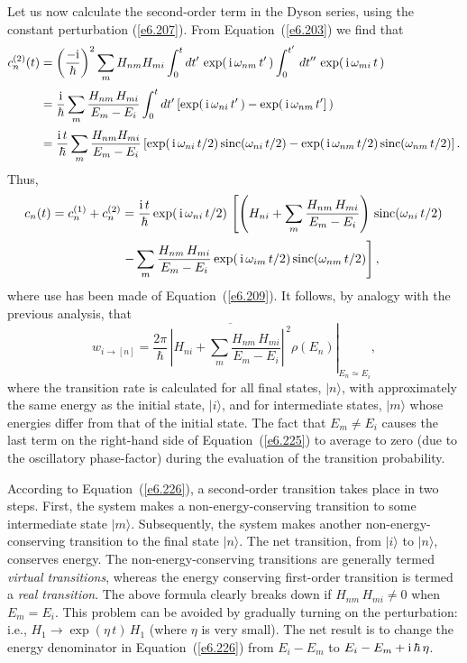 Let us now calculate  the second-order term in the Dyson series, using the
constant perturbation (\ref{e6.207}). From Equation~(\ref{e6.203}) we find that
\begin{align}
c_n^{(2)}(t) &= \left(\frac{-{\rm i}}{\hbar}\right)^2 \sum_m H_{nm} H_{mi}
\int_0^t dt'\, \exp(\,{\rm i}\,\omega_{nm}\,t'\,) \int_0^{t'} \,
dt'' \,\exp(\,{\rm i} \,\omega_{mi}\,t\,)\nonumber\\[0.5ex]
&=\frac{\rm i}{\hbar} \sum_m \frac{H_{nm} \,H_{mi}}{E_m - E_i}
\int_0^t dt' \left[\exp(\,{\rm i}\,\omega_{ni}\,t'\,)
 - \exp(\,{\rm i}\,\omega_{nm}\,t']\,\right)\nonumber\\[0.5ex]
&= \frac{{\rm i}\,t}{\hbar} \sum_m \frac{H_{nm} H_{mi}}{E_m - E_i}
\left[ \exp(\,{\rm i}\,\omega_{ni}\, t/2) \,{\rm sinc}(\omega_{ni}\,t/2)- \exp(\,{\rm i}\,\omega_{nm} \,t/2) \,{\rm sinc}(\omega_{nm}\,t/2)\right].
\end{align}
Thus,
\begin{align}
c_n(t) = c_n^{(1)}+ c_n^{(2)} &=  \frac{{\rm i}\,t}{\hbar}
\exp(\,{\rm i}\,\omega_{ni}\,t/2)\,
\left[ \left(H_{ni} + \sum_m \frac{H_{nm}\,H_{mi}}{E_m - E_i}\right)\, {\rm sinc} (\omega_{ni}\,t/2)\right.\nonumber
\\[0.5ex]&\left.
 - \sum_m\frac{H_{nm}\,H_{mi}}{E_m - E_i}
\exp(\,{\rm i}\,\omega_{im}\,t/2)\,{\rm sinc}(\omega_{nm}\,t/2)\right],\label{e6.225}
\end{align}
where use has been made of Equation~(\ref{e6.209}). It follows, by analogy with the
previous analysis, that
\begin{equation}\label{e6.226}
w_{i\rightarrow [n]} =\left. \frac{2\pi}{\hbar}\, \overline{ \left|
H_{ni} + \sum_m \frac{H_{nm}\,H_{mi}}{E_m - E_i}\right|^{\,2}} \rho(E_n)
\right|_{E_n  \simeq E_i},
\end{equation}
where the transition rate is calculated for all final states, $|n\rangle$, with
approximately the same energy as the initial state, $|i\rangle$, and for
intermediate states, $|m\rangle$ whose energies differ from that of
the initial state. The fact that $E_m\neq E_i$ causes the last term on the
right-hand side of Equation~(\ref{e6.225}) to average to zero (due to the oscillatory
phase-factor) during the evaluation of the transition probability. 

According to Equation~(\ref{e6.226}), a second-order transition takes place in
two steps. First, the system makes a non-energy-conserving transition to
some intermediate state $|m\rangle$. Subsequently,  the system makes another
non-energy-conserving transition to the final state $|n\rangle$. The net
transition, from $|i\rangle$ to $|n\rangle$, conserves energy. The
non-energy-conserving transitions are generally termed {\em virtual
transitions}, whereas the energy conserving first-order transition
is termed a {\em real transition}. The above formula clearly breaks down
if $H_{nm}\,H_{mi}\neq 0$ when $E_m =  E_i$. This problem can be avoided by
gradually turning on the perturbation: {\rm i.e.}, $H_1\rightarrow \exp(\eta\,t)\,
H_1$ (where $\eta$ is very small). The net result is to change the energy
denominator in Equation~(\ref{e6.226}) from $E_i-E_m$ to $E_i - 
E_m +{\rm i}\,\hbar\,\eta$. 

